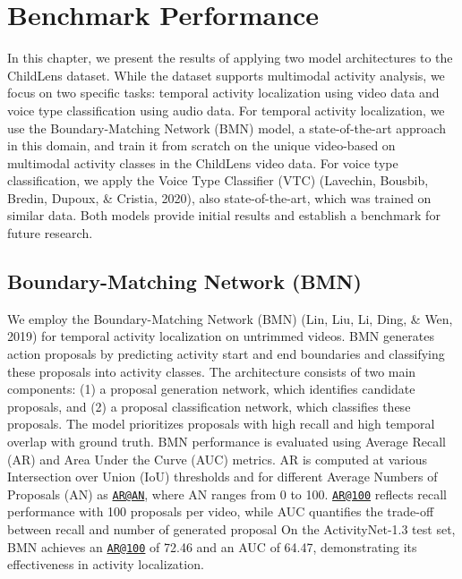 \documentclass[
  man,floatsintext]{apa6}
\begin{document}
\section{Benchmark Performance}\label{benchmark-performance}

In this chapter, we present the results of applying two model architectures to the ChildLens dataset. While the dataset supports multimodal activity analysis, we focus on two specific tasks: temporal activity localization using video data and voice type classification using audio data. For temporal activity localization, we use the Boundary-Matching Network (BMN) model, a state-of-the-art approach in this domain, and train it from scratch on the unique video-based on multimodal activity classes in the ChildLens video data. For voice type classification, we apply the Voice Type Classifier (VTC) (Lavechin, Bousbib, Bredin, Dupoux, \& Cristia, 2020), also state-of-the-art, which was trained on similar data. Both models provide initial results and establish a benchmark for future research.

\subsection{Boundary-Matching Network (BMN)}\label{boundary-matching-network-bmn}

We employ the Boundary-Matching Network (BMN) (Lin, Liu, Li, Ding, \& Wen, 2019) for temporal activity localization on untrimmed videos. BMN generates action proposals by predicting activity start and end boundaries and classifying these proposals into activity classes. The architecture consists of two main components: (1) a proposal generation network, which identifies candidate proposals, and (2) a proposal classification network, which classifies these proposals. The model prioritizes proposals with high recall and high temporal overlap with ground truth.
BMN performance is evaluated using Average Recall (AR) and Area Under the Curve (AUC) metrics. AR is computed at various Intersection over Union (IoU) thresholds and for different Average Numbers of Proposals (AN) as \href{mailto:AR@AN}{\nolinkurl{AR@AN}}, where AN ranges from 0 to 100. \href{mailto:AR@100}{\nolinkurl{AR@100}} reflects recall performance with 100 proposals per video, while AUC quantifies the trade-off between recall and number of generated proposal On the ActivityNet-1.3 test set, BMN achieves an \href{mailto:AR@100}{\nolinkurl{AR@100}} of 72.46 and an AUC of 64.47, demonstrating its effectiveness in activity localization.
\end{document}
